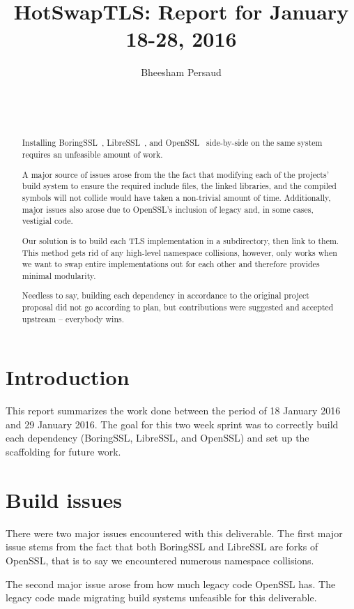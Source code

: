 \documentclass{acm_proc_article-sp}
\title{HotSwapTLS: Report for January 18-28, 2016}
\author{
    \alignauthor
    Bheesham Persaud\\
        \affaddr{Carleton University}\\
        \affaddr{1125 Colonel By Drive}\\
        \affaddr{Ottawa, Ontario}\\
        \email{bheeshampersaud@cmail.carleton.ca}
}
\begin{document}
\maketitle

\begin{abstract}\label{sec:abstract}
  Installing BoringSSL~\cite{boringssl}, LibreSSL~\cite{libressl}, and
  OpenSSL~\cite{openssl} side-by-side on the same system requires an unfeasible
  amount of work.

  A major source of issues arose from the the fact that modifying each of the
  projects' build system to ensure the required include files, the linked
  libraries, and the compiled symbols will not collide would have taken a
  non-trivial amount of time. Additionally, major issues also arose due to
  OpenSSL's inclusion of legacy and, in some cases, vestigial code.

  Our solution is to build each TLS implementation in a subdirectory, then link
  to them. This method gets rid of any high-level namespace collisions, however,
  only works when we want to swap entire implementations out for each other and
  therefore provides minimal modularity.

  Needless to say, building each dependency in accordance to the original
  project proposal did not go according to plan, but contributions were
  suggested and accepted upstream -- everybody wins.
\end{abstract}

\section{Introduction}

This report summarizes the work done between the period of 18 January 2016 and
29 January 2016. The goal for this two week sprint was to correctly build each
dependency (BoringSSL, LibreSSL, and OpenSSL) and set up the scaffolding for
future work.

\section{Build issues}
There were two major issues encountered with this deliverable. The first major
issue stems from the fact that both BoringSSL and LibreSSL are forks of OpenSSL,
that is to say we encountered numerous namespace collisions.

The second major issue arose from how much legacy code OpenSSL has. The legacy
code made migrating build systems unfeasible for this deliverable.
\end{document}
